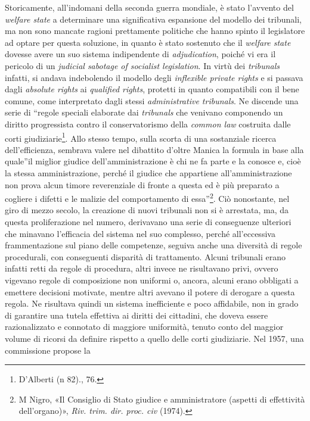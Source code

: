 \documentclass[12pt,it,a4paper,]{report}
\begin{document}
Storicamente, all'indomani della seconda guerra mondiale, è stato
l'avvento del \emph{welfare state} a determinare una significativa
espansione del modello dei tribunali, ma non sono mancate ragioni
prettamente politiche che hanno spinto il legislatore ad optare per
questa soluzione, in quanto è stato sostenuto che il \emph{welfare
state} dovesse avere un suo sistema indipendente di \emph{adjudication},
poiché vi era il pericolo di un \emph{judicial sabotage of socialist
legislation}. In virtù dei \emph{tribunals} infatti, si andava
indebolendo il modello degli \emph{inflexible private rights} e si
passava dagli \emph{absolute rights} ai \emph{qualified rights},
protetti in quanto compatibili con il bene comune, come interpretato
dagli stessi \emph{administrative tribunals}. Ne discende una serie di
``regole speciali elaborate dai \emph{tribunals} che venivano componendo
un diritto progressista contro il conservatorismo della \emph{common
law} costruita dalle corti giudiziarie\footnote{{D'Alberti (n 82).}, 76.}.
Allo stesso tempo, sulla scorta di una sostanziale ricerca
dell'efficienza, sembrava valere nel dibattito d'oltre Manica la formula
in base alla quale''il miglior giudice dell'amministrazione è chi ne fa
parte e la conosce e, cioè la stessa amministrazione, perché il giudice
che appartiene all'amministrazione non prova alcun timore reverenziale
di fronte a questa ed è più preparato a cogliere i difetti e le malizie
del comportamento di essa''\footnote{{M Nigro, {«Il Consiglio di Stato
  giudice e amministratore (aspetti di effettività dell'organo)»},
  \emph{Riv. trim. dir. proc. civ} (1974).}}. Ciò nonostante, nel giro
di mezzo secolo, la creazione di nuovi tribunali non si è arrestata, ma,
da questa proliferazione nel numero, derivavano una serie di conseguenze
ulteriori che minavano l'efficacia del sistema nel suo complesso, perché
all'eccessiva frammentazione sul piano delle competenze, seguiva anche
una diversità di regole procedurali, con conseguenti disparità di
trattamento. Alcuni tribunali erano infatti retti da regole di
procedura, altri invece ne risultavano privi, ovvero vigevano regole di
composizione non uniformi o, ancora, alcuni erano obbligati a emettere
decisioni motivate, mentre altri avevano il potere di derogare a questa
regola. Ne risultava quindi un sistema inefficiente e poco affidabile,
non in grado di garantire una tutela effettiva ai diritti dei cittadini,
che doveva essere razionalizzato e connotato di maggiore uniformità,
tenuto conto del maggior volume di ricorsi da definire rispetto a quello
delle corti giudiziarie. Nel 1957, una commissione propose la
\end{document}
